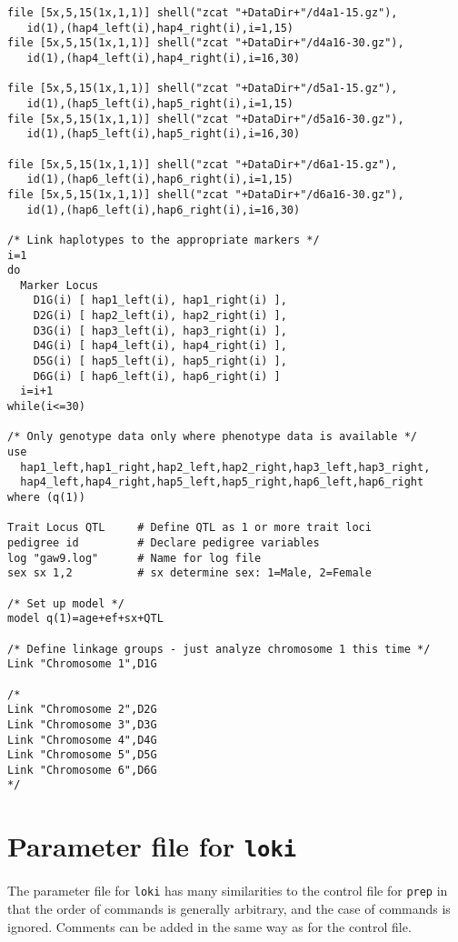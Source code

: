 \documentclass[10pt,a4paper]{article}
\newcommand{\Prep}{\texttt{prep}\xspace}
\newcommand{\Loki}{\texttt{loki}\xspace}
\begin{document}
\begin{verbatim}
file [5x,5,15(1x,1,1)] shell("zcat "+DataDir+"/d4a1-15.gz"),
   id(1),(hap4_left(i),hap4_right(i),i=1,15)
file [5x,5,15(1x,1,1)] shell("zcat "+DataDir+"/d4a16-30.gz"),
   id(1),(hap4_left(i),hap4_right(i),i=16,30)

file [5x,5,15(1x,1,1)] shell("zcat "+DataDir+"/d5a1-15.gz"),
   id(1),(hap5_left(i),hap5_right(i),i=1,15)
file [5x,5,15(1x,1,1)] shell("zcat "+DataDir+"/d5a16-30.gz"),
   id(1),(hap5_left(i),hap5_right(i),i=16,30)

file [5x,5,15(1x,1,1)] shell("zcat "+DataDir+"/d6a1-15.gz"),
   id(1),(hap6_left(i),hap6_right(i),i=1,15)
file [5x,5,15(1x,1,1)] shell("zcat "+DataDir+"/d6a16-30.gz"),
   id(1),(hap6_left(i),hap6_right(i),i=16,30)

/* Link haplotypes to the appropriate markers */
i=1
do
  Marker Locus 
    D1G(i) [ hap1_left(i), hap1_right(i) ], 
    D2G(i) [ hap2_left(i), hap2_right(i) ],
    D3G(i) [ hap3_left(i), hap3_right(i) ], 
    D4G(i) [ hap4_left(i), hap4_right(i) ], 
    D5G(i) [ hap5_left(i), hap5_right(i) ], 
    D6G(i) [ hap6_left(i), hap6_right(i) ]
  i=i+1
while(i<=30)

/* Only genotype data only where phenotype data is available */
use
  hap1_left,hap1_right,hap2_left,hap2_right,hap3_left,hap3_right,
  hap4_left,hap4_right,hap5_left,hap5_right,hap6_left,hap6_right
where (q(1))

Trait Locus QTL     # Define QTL as 1 or more trait loci
pedigree id         # Declare pedigree variables
log "gaw9.log"      # Name for log file
sex sx 1,2          # sx determine sex: 1=Male, 2=Female

/* Set up model */
model q(1)=age+ef+sx+QTL

/* Define linkage groups - just analyze chromosome 1 this time */
Link "Chromosome 1",D1G

/*
Link "Chromosome 2",D2G
Link "Chromosome 3",D3G
Link "Chromosome 4",D4G
Link "Chromosome 5",D5G
Link "Chromosome 6",D6G
*/
\end{verbatim}
\section{Parameter file for \Loki}
\label{loki_param}
The parameter file for \Loki has many similarities to the control file for
\Prep in that the order of commands is generally arbitrary, and the case of
commands is ignored.  Comments can be added in the same way as for the
control file.
\end{document}

